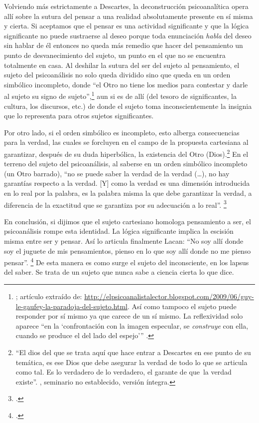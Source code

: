 Volviendo más estrictamente a Descartes, la deconstrucción psicoanalítica opera allí sobre la sutura del pensar a una realidad absolutamente presente en sí misma y cierta. Si aceptamos que el pensar es una actividad significante y que la lógica significante no puede sustraerse al deseo porque toda enunciación \emph{habla} del deseo sin hablar de él  entonces no queda más remedio que hacer del pensamiento un punto de desvanecimiento del sujeto, un punto en el que no se encuentra totalmente en casa. Al deshilar la sutura del ser del sujeto al pensamiento, el sujeto del psicoanálisis no solo queda dividido sino que queda en un orden simbólico incompleto, donde \enquote{el Otro no tiene los medios para contestar y darle al sujeto su signo de sujeto},\footnote{\cite[][4]{@7120-LEGAUFEY2009}; artículo extraído de: \url{http://elpsicoanalistalector.blogspot.com/2009/06/guy-le-gaufey-la-paradoja-del-sujeto.html}. Así como tampoco el sujeto puede responder por sí mismo ya que carece de un sí mismo. La reflexividad solo aparece \enquote{en la \enquote{confrontación con la imagen especular, se \emph{construye} con ella, cuando se produce el  del lado del espejo}} \parencite[][9]{@7120-LEGAUFEY2009}.} aun si es de allí (del tesoro de significantes, la cultura, los discursos, etc.) de donde el sujeto toma inconscientemente la insignia que lo representa para otros sujetos significantes.

Por otro lado, si el orden simbólico es incompleto, esto alberga consecuencias para la verdad, las cuales se forcluyen en el campo de la propuesta cartesiana al garantizar, después de su duda hiperbólica, la existencia del Otro (Dios).\footnote{\enquote{El dios del que se trata aquí que hace entrar a Descartes en ese punto de su temática, es ese Dios que debe asegurar la verdad de todo lo que se articula como tal. Es lo verdadero de lo verdadero, el garante de que~la verdad existe}. \textcite[][23]{@7123-LACAN2000}, seminario no establecido, versión íntegra.} En el terreno del sujeto del psicoanálisis, al saberse en un orden simbólico incompleto (un Otro barrado), \enquote{no se puede saber la verdad de la verdad (\ldots), no hay garantías respecto a la verdad. {[}Y{]} como la verdad es una dimensión introducida en lo real por la palabra, es la palabra misma la que debe garantizar la verdad, a diferencia de la exactitud que se garantiza por su adecuación a lo real}. \footcite[][3-4]{@7124-WEISSE-SINFECHA}

En conclusión, si dijimos que el sujeto cartesiano homologa pensamiento a ser, el psicoanálisis rompe esta identidad. La lógica significante implica la escisión misma entre ser y pensar. Así lo articula finalmente Lacan: \enquote{No soy allí donde soy el juguete de mis pensamientos, pienso en lo que soy allí donde no me pienso pensar}. \footcite[][202]{@7125-LACAN1979} De esta manera es como surge el sujeto del inconsciente, en los lapsus del saber. Se trata de un sujeto que nunca sabe a ciencia cierta lo que dice.

